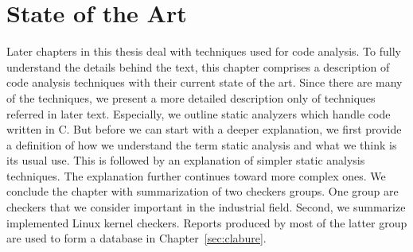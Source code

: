 
\chapter{State of the Art}\label{sec:state}
Later chapters in this thesis deal with techniques used for code analysis.
To fully understand the details behind the text, this chapter comprises a
description of code analysis techniques with their current state of the art.
Since there are many of the techniques, we present a more detailed description
only of techniques referred in later text. Especially, we outline static
analyzers which handle code written in C.  But before we can start with a
deeper explanation, we first provide a definition of how we understand the
term static analysis and what we think is its usual use. This is followed by
an explanation of simpler static analysis techniques. The explanation further
continues toward more complex ones. We conclude the chapter with summarization
of two checkers groups. One group are checkers that we consider important in
the industrial field. Second, we summarize implemented Linux kernel checkers.
Reports produced by most of the latter group are used to form a database in
Chapter~\ref{sec:clabure}.

